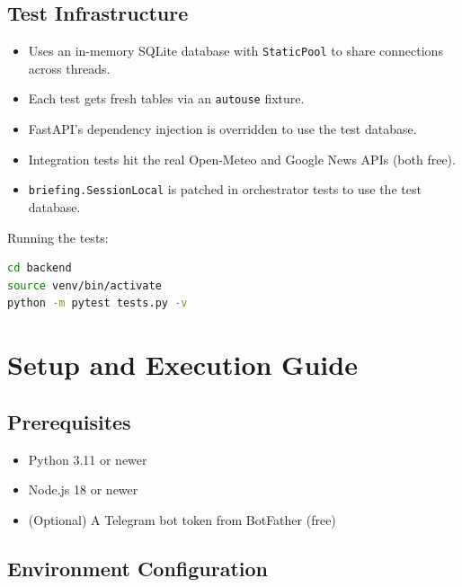 \documentclass[12pt, a4paper]{article}
\begin{document}
\subsection{Test Infrastructure}

\begin{itemize}[leftmargin=2em]
  \item Uses an in-memory SQLite database with \texttt{StaticPool} to share connections across threads.
  \item Each test gets fresh tables via an \texttt{autouse} fixture.
  \item FastAPI's dependency injection is overridden to use the test database.
  \item Integration tests hit the real Open-Meteo and Google News APIs (both free).
  \item \texttt{briefing.SessionLocal} is patched in orchestrator tests to use the test database.
\end{itemize}

Running the tests:

\begin{lstlisting}[language=bash, title={Running tests}]
cd backend
source venv/bin/activate
python -m pytest tests.py -v
\end{lstlisting}

\section{Setup and Execution Guide}

\subsection{Prerequisites}

\begin{itemize}[leftmargin=2em]
  \item Python 3.11 or newer
  \item Node.js 18 or newer
  \item (Optional) A Telegram bot token from BotFather (free)
\end{itemize}

\subsection{Environment Configuration}
\end{document}
